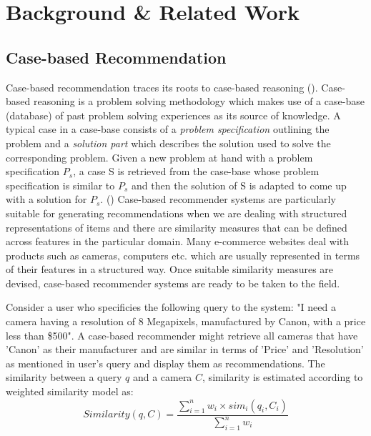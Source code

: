 \chapter{Background \& Related Work}
\label{chap:background}

\section{Case-based Recommendation}
Case-based recommendation traces its roots to case-based reasoning (\cite{aamodt94}).
Case-based reasoning is a problem solving methodology which makes use of a case-base (database) of past problem solving experiences as its source of knowledge. 
A typical case in a case-base consists of a \textit{problem specification} outlining the problem and a \textit{solution part} which describes the solution used to solve the corresponding problem.
Given a new problem at hand with a problem specification $P_s$, a case S is retrieved from the case-base whose problem specification is similar to $P_s$ and then the solution of S is adapted to come up with a solution for $P_s$. (\cite{smyth2007})
Case-based recommender systems are particularly suitable for generating recommendations when we are dealing with structured representations of items and there are similarity measures that can be defined across features in the particular domain. 
Many e-commerce websites deal with products such as cameras, computers etc. which are usually represented in terms of their features in a structured way. 
Once suitable similarity measures are devised, case-based recommender systems are ready to be taken to the field.

Consider a user who specificies the following query to the system: "I need a camera having a resolution of 8 Megapixels, manufactured by Canon, with a price less than \$500".
A case-based recommender might retrieve all cameras that have 'Canon' as their manufacturer and are similar in terms of 'Price' and 'Resolution' as mentioned in user's query and display them as recommendations.
The similarity between a query $q$ and a camera $C$, similarity is estimated according to weighted similarity model as:
\begin{equation}
\label{eq:sim}
Similarity(q, C) = \frac{\sum_{i=1}^{n}{w_i \times sim_i(q_i, C_i)}}{\sum_{i=1}^{n}w_i}
\end{equation}

